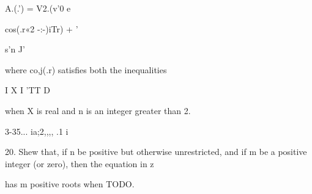 A.(.') = V2.(v'0 e

cos(.r«2 -:-)iTr) + '

s'n J'

where co,j(.r) satisfies both the inequalities

I X I 'TT D

when X is real and n is an integer greater than 2. 

3-35... ia;2,,,, .1 i

20. Shew that, if n be positive but otherwise unrestricted, and if m
be a positive integer (or zero), then the equation in z

has m positive roots when TODO. 